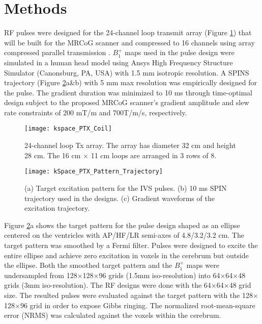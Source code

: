 \section*{Methods}
RF pulses were designed for the 24-channel loop transmit array (Figure \ref{fig:Coil}) that will be built for the MRCoG scanner  and compressed to 16 channels using array compressed parallel transmission \cite{cao2016array}. $B_1^+$ maps used in the pulse design were simulated in a human head model using Ansys High Frequency Structure Simulator (Canonsburg, PA, USA) with 1.5 mm isotropic resolution. A SPINS  trajectory \cite{malik2012tailored} (Figure \ref{fig:Target}a\&b) with 5 mm max resolution was empirically designed for the pulse. The gradient duration was minimized to 10 ms through time-optimal design \cite{lustig2008fast} subject to the proposed MRCoG scanner’s gradient amplitude and slew rate constraints of 200 mT/m and 700T/m/s, respectively. 

\begin{figure}
	\centering
	\texttt{[image: kspace\_PTX\_Coil]}
	\caption{24-channel loop Tx array. The array has diameter 32 cm and height 28 cm. The 16 cm $\times$ 11 cm loops are arranged in 3 rows of 8.}
	\label{fig:Coil}
\end{figure}



\begin{figure}
	\centering
	\texttt{[image: kSpace\_PTX\_Pattern\_Trajectory]}
	\caption{(a) Target excitation pattern for the IVS pulses. (b) 10 ms SPIN trajectory used in the designs. (c) Gradient waveforms of the excitation trajectory.}
	\label{fig:Target}
\end{figure}
Figure \ref{fig:Target}a shows the target pattern for the pulse design shaped as an ellipse centered on the ventricles with AP/HF/LR semi-axes of 4.8/3.2/3.2 cm. The target pattern was smoothed by a Fermi filter. Pulses were designed to excite the entire ellipse and achieve zero excitation in voxels in the cerebrum but outside the ellipse. Both the smoothed target pattern and the $B_1^+$ maps were undersampled from 128$\times$128$\times$96 grids (1.5mm iso-resolution) into 64$\times$64$\times$48 grids (3mm iso-resolution). The RF designs were done with the 64$\times$64$\times$48 grid size. The resulted pulses were evaluated against the target pattern with the 128$\times$128$\times$96 grid in order to expose Gibbs ringing. The normalized root-mean-square error (NRMS) was calculated against the voxels within the cerebrum.

